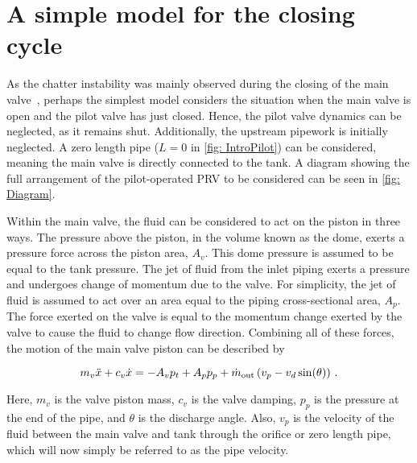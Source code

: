 \chapter{A simple model for the closing cycle} \label{sec: Prog}

As the chatter instability was mainly observed during the closing of the main valve~\cite{Allison2015TestingValves}, perhaps the simplest model considers the situation when the main valve is open and the pilot valve has just closed. Hence, the pilot valve dynamics can be neglected, as it remains shut. Additionally, the upstream pipework is initially neglected. A zero length pipe ($L=0$ in \cref{fig: IntroPilot}) can be considered, meaning the main valve is directly connected to the tank. A diagram showing the full arrangement of the pilot-operated PRV to be considered can be seen in \cref{fig: Diagram}.



Within the main valve, the fluid can be considered to act on the piston in three ways. The pressure above the piston, in the volume known as the dome, exerts a pressure force across the piston area, $A_v$. This dome pressure is assumed to be equal to the tank pressure. The jet of fluid from the inlet piping exerts a pressure and undergoes change of momentum due to the valve. For simplicity, the jet of fluid is assumed to act over an area equal to the piping cross-sectional area, $A_p$. The force exerted on the valve is equal to the momentum change exerted by the valve to cause the fluid to change flow direction. Combining all of these forces, the motion of the main valve piston can be described by

\begin{equation} \label{eq: Newton}
    m_v \ddot{x} + c_v \dot{x} = - A_v p_t + A_p p_p + \dot{m}_{\rm{out}} \left( v_p - v_d \sin(\theta) \right) \, .
\end{equation}

Here, $m_v$ is the valve piston mass, $c_v$ is the valve damping, $p_p$ is the pressure at the end of the pipe, and $\theta$ is the discharge angle. Also, $v_p$ is the velocity of the fluid between the main valve and tank through the orifice or zero length pipe, which will now simply be referred to as the pipe velocity.

